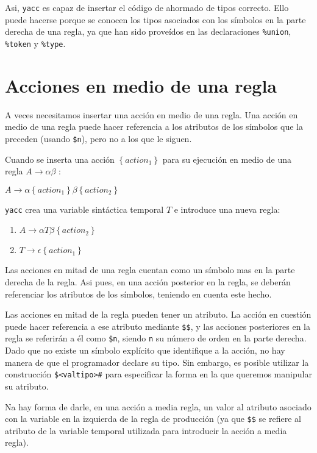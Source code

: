 Asi, \verb|yacc| es capaz de insertar 
el código de ahormado de tipos correcto.
Ello puede hacerse porque se conocen los tipos 
asociados con los símbolos en la parte derecha de 
una regla, ya que han sido proveídos en  
las declaraciones \verb|%union|, \verb|%token| y \verb|%type|.
 
\section{Acciones en medio de una regla}
\label{section:mediareglayacc}
A veces necesitamos insertar una acción en medio de una regla.
Una acción en medio de una regla puede hacer referencia a los atributos de
los símbolos que la preceden (usando \verb|$n|), pero no a los que le siguen.

Cuando se  inserta una acción $\left \{ action_1\right \}$
para su ejecución en medio de una regla $A \rightarrow \alpha
\beta$ :
\begin{center}
$A \rightarrow \alpha \left \{ action_1 \right \} \beta \left \{ action_2\right \}$ 
\end{center}
\verb|yacc| crea una variable sintáctica temporal $T$ e introduce una nueva regla:

\begin{center}
\begin{enumerate}
\item
$A \rightarrow \alpha T \beta \left \{ action_2\right \}$ 
\item
$T \rightarrow \epsilon \left \{ action_1 \right \}$ 
\end{enumerate}
\end{center}

Las acciones en mitad de una regla cuentan como un símbolo mas en la parte 
derecha de la regla. Asi pues, en una acción posterior en la regla,
se deberán referenciar los  atributos de los símbolos, teniendo en cuenta este hecho.

Las acciones en mitad de la regla pueden tener un atributo. La acción en cuestión puede
hacer referencia a ese atributo mediante \verb|$$|, y las acciones posteriores
en la regla se referirán a él como \verb|$n|, siendo \verb|n| su número de orden
en la parte derecha. Dado que no existe un símbolo explícito que identifique a 
la acción, no hay manera de que el programador declare su tipo. Sin embargo, es
posible utilizar la construcción \verb|$<valtipo>#| para especificar 
la forma en la que queremos manipular su atributo.

Na hay forma de darle, en una acción a media regla, un valor al atributo asociado con
la variable en la izquierda de la regla de producción (ya que \verb|$$| se refiere
al atributo de la variable temporal utilizada para introducir la acción a media regla).

